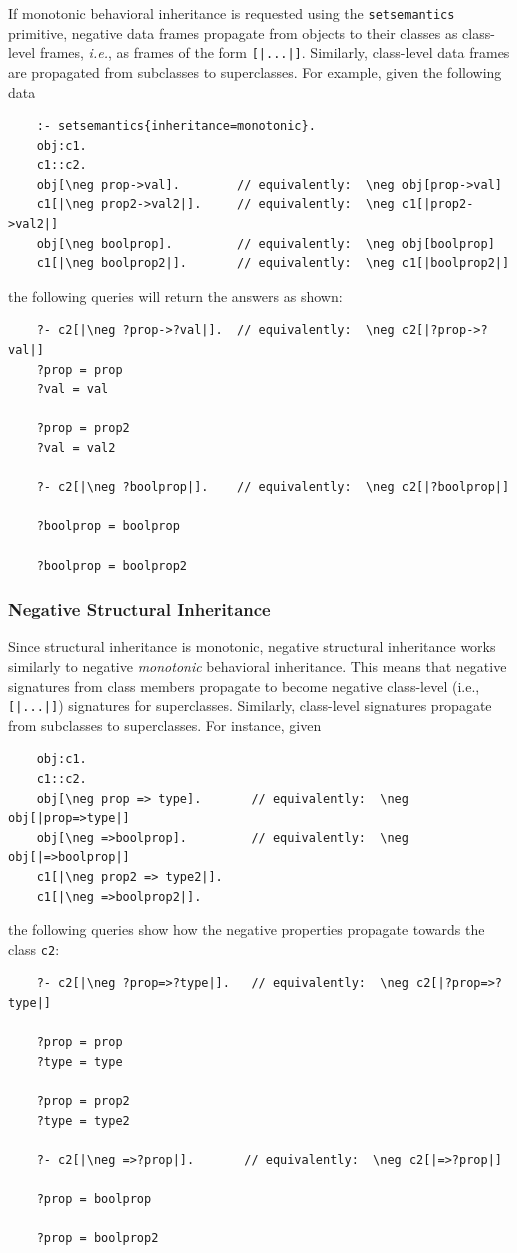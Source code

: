 \documentclass[11pt]{article}
\begin{document}
If monotonic behavioral inheritance is requested using the
\texttt{setsemantics} primitive, negative data frames propagate from
objects to their classes as class-level frames, {\it i.e.}, as frames of
the form \texttt{[|...|]}.  Similarly, class-level data frames are
propagated from subclasses to superclasses. For example, given the
following data
\begin{verbatim}
    :- setsemantics{inheritance=monotonic}.
    obj:c1.
    c1::c2.
    obj[\neg prop->val].        // equivalently:  \neg obj[prop->val]
    c1[|\neg prop2->val2|].     // equivalently:  \neg c1[|prop2->val2|]
    obj[\neg boolprop].         // equivalently:  \neg obj[boolprop]
    c1[|\neg boolprop2|].       // equivalently:  \neg c1[|boolprop2|]
\end{verbatim}
the following queries will return the answers as shown:
\begin{verbatim}
    ?- c2[|\neg ?prop->?val|].  // equivalently:  \neg c2[|?prop->?val|]
    ?prop = prop
    ?val = val

    ?prop = prop2
    ?val = val2

    ?- c2[|\neg ?boolprop|].    // equivalently:  \neg c2[|?boolprop|]

    ?boolprop = boolprop

    ?boolprop = boolprop2
\end{verbatim}


\subsubsection{Negative Structural Inheritance}

Since structural inheritance is monotonic,
negative structural inheritance works similarly to negative \emph{monotonic}
behavioral inheritance. This means that negative signatures from class
members propagate to become negative class-level (i.e.,
\texttt{[|...|]}) signatures for superclasses. Similarly, class-level
signatures propagate from subclasses to superclasses. For instance, given
\begin{verbatim}
    obj:c1.
    c1::c2.
    obj[\neg prop => type].       // equivalently:  \neg obj[|prop=>type|]
    obj[\neg =>boolprop].         // equivalently:  \neg obj[|=>boolprop|]
    c1[|\neg prop2 => type2|].
    c1[|\neg =>boolprop2|].
\end{verbatim}
the following queries show how the negative properties propagate towards
the class \texttt{c2}:
\begin{verbatim}
    ?- c2[|\neg ?prop=>?type|].   // equivalently:  \neg c2[|?prop=>?type|]

    ?prop = prop
    ?type = type

    ?prop = prop2
    ?type = type2

    ?- c2[|\neg =>?prop|].       // equivalently:  \neg c2[|=>?prop|]

    ?prop = boolprop

    ?prop = boolprop2
\end{verbatim}
\end{document}
